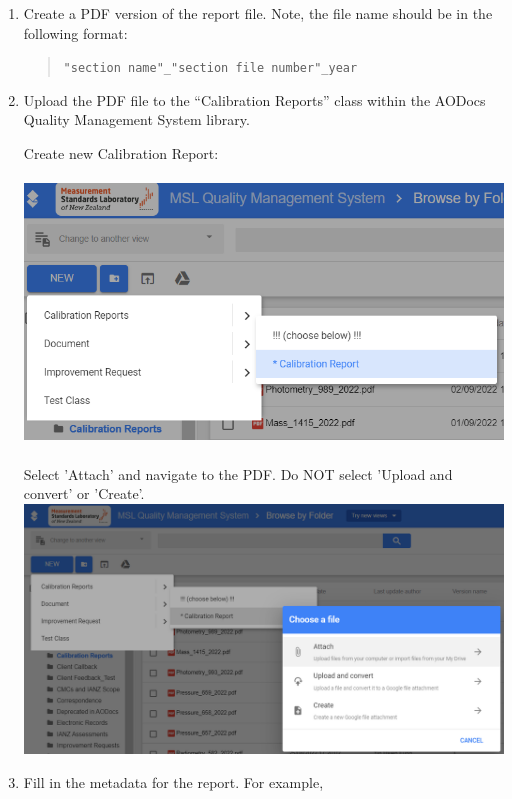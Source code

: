 \begin{enumerate}
\item Create a PDF version of the report file. Note, the file name should be in the following format:
\begin{quote}
\texttt{"section name"\_"section file number"\_year}
\end{quote}
\item Upload the PDF file to the ``Calibration Reports'' class within the AODocs Quality Management System library. 

Create new Calibration Report: \\
\\
\includegraphics[scale=.9]{pictures/new_report} \\
\\
Select 'Attach' and navigate to the PDF.  Do NOT select 'Upload and convert' or 'Create'.
\\
\includegraphics[scale=.55]{pictures/new_report2} \\
\item Fill in the metadata for the report. For example,
\begin{center}

\end{center}
\end{enumerate}
